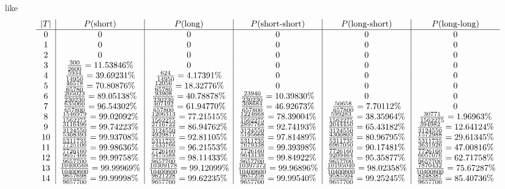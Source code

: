 like
\[
\begin{array}{c| c| c| c| c| c}
|T| & P(\text{short}) & P(\text{long}) & P(\text{short-short}) & P(\text{long-short}) & P(\text{long-long}) \\\hline
0 & 0 & 0 & 0 & 0 & 0\\
1 & 0 & 0 & 0 & 0 & 0\\
2 & 0 & 0 & 0 & 0 & 0\\
3 & \frac{300}{2600} = 11.53846\% & 0 & 0 & 0 & 0\\
4 & \frac{5934}{14950} = 39.69231\% & \frac{624}{14950} = 4.17391\% & 0 & 0 & 0\\
5 & \frac{46578}{65780} = 70.80876\% & \frac{12056}{65780} = 18.32776\% & 0 & 0 & 0\\
6 & \frac{205023}{230230} = 89.05138\% & \frac{93908}{230230} = 40.78878\% & \frac{23940}{230230} = 10.39830\% & 0 & 0\\
7 & \frac{635060}{657800} = 96.54302\% & \frac{407492}{657800} = 61.94770\% & \frac{308684}{657800} = 46.92673\% & \frac{50658}{657800} = 7.70112\% & 0\\
8 & \frac{1546979}{1562275} = 99.02092\% & \frac{1206313}{1562275} = 77.21515\% & \frac{1224668}{1562275} = 78.39004\% & \frac{599283}{1562275} = 38.35964\% & \frac{30771}{1562275} = 1.96963\%\\
9 & \frac{3116496}{3124550} = 99.74223\% & \frac{2716722}{3124550} = 86.94762\% & \frac{2897768}{3124550} = 92.74193\% & \frac{2044450}{3124550} = 65.43182\% & \frac{394982}{3124550} = 12.64124\%\\
10 & \frac{5308393}{5311735} = 99.93708\% & \frac{4929877}{5311735} = 92.81105\% & \frac{5195668}{5311735} = 97.81489\% & \frac{4300803}{5311735} = 80.96795\% & \frac{1572988}{5311735} = 29.61345\%\\
11 & \frac{7725106}{7726160} = 99.98636\% & \frac{7433766}{7726160} = 96.21553\% & \frac{7679338}{7726160} = 99.39398\% & \frac{6967050}{7726160} = 90.17481\% & \frac{3631926}{7726160} = 47.00816\%\\
12 & \frac{9657466}{9657700} = 99.99758\% & \frac{9475588}{9657700} = 98.11433\% & \frac{9643138}{9657700} = 99.84922\% & \frac{9209464}{9657700} = 95.35877\% & \frac{6057076}{9657700} = 62.71758\%\\
13 & \frac{10400568}{10400600} = 99.99969\% & \frac{10309178}{10400600} = 99.12099\% & \frac{10397372}{10400600} = 99.96896\% & \frac{10195040}{10400600} = 98.02358\% & \frac{7870432}{10400600} = 75.67287\%\\
14 & \frac{9657698}{9657700} = 99.99998\% & \frac{9621228}{9657700} = 99.62235\% & \frac{9657256}{9657700} = 99.99540\% & \frac{9585504}{9657700} = 99.25245\% & \frac{8248387}{9657700} = 85.40736\%\\

\end{array}\]
